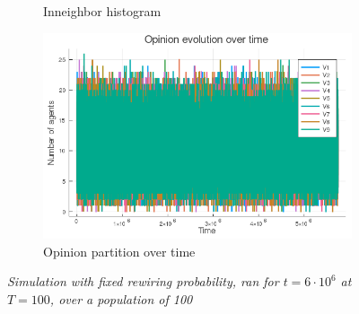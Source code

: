 \documentclass[12pt,openright,twoside]{book}
\begin{document}
\begin{appendices}
\begin{figure}[!htb]
\begin{subfigure}{0.47\linewidth}
    \caption{Inneighbor histogram}
\end{subfigure}
\begin{subfigure}{0.47\linewidth}
    \includegraphics[width=\linewidth]{figures/2_2_t100/vote_evolution.png}
    \caption{Opinion partition over time}
\end{subfigure}
\caption{\textit{{\small Simulation with fixed rewiring probability, ran for $t=6\cdot 10^6$ at $T=100$, over a population of 100}}}
\label{2_2_t100}
\end{figure}

\end{appendices}
\end{document}
